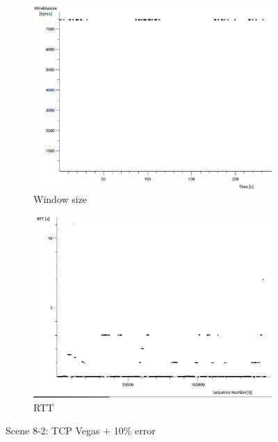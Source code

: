 \documentclass[conference,a4paper]{IEEEtran}
\begin{document}
\begin{figure}
\begin{subfigure}[b]{0.2\textwidth}
  \includegraphics[width=\textwidth]{s8-2_wsize}
  \caption{Window size}
 \end{subfigure}
 \begin{subfigure}[b]{0.2\textwidth}
  \includegraphics[width=\textwidth]{s8-2_rtt}
  \caption{RTT}
 \end{subfigure}
 \caption{Scene 8-2: TCP Vegas + 10\% error}
\end{figure}
\end{document}
